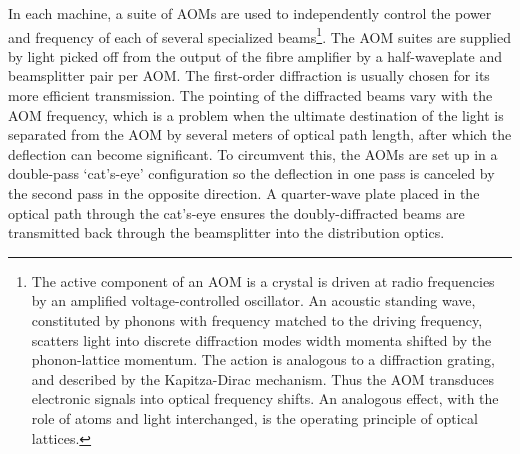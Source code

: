 	



	In each machine, a suite of AOMs are used to independently control the power and frequency of each of several specialized beams\footnote{The active component of an AOM is a crystal is driven at radio frequencies by an amplified voltage-controlled oscillator.	An acoustic standing wave, constituted by phonons with frequency matched to the driving frequency, scatters light into discrete diffraction modes width momenta shifted by the phonon-lattice momentum.	The action is analogous to a diffraction grating, and described by the Kapitza-Dirac mechanism.	Thus the AOM transduces electronic signals into optical frequency shifts.	An analogous effect, with the role of atoms and light interchanged, is the operating principle of optical lattices.}.
	The AOM suites are supplied by light picked off from the output of the fibre amplifier by a half-waveplate and beamsplitter pair per AOM.
	The first-order diffraction is usually chosen for its more efficient transmission.
	The pointing of the diffracted beams vary with the AOM frequency, which is a problem when the ultimate destination of the light is separated from the AOM by several meters of optical path length, after which the deflection can become significant.
	To circumvent this, the AOMs are set up in a double-pass `cat's-eye' configuration so the deflection in one pass is canceled by the second pass in the opposite direction.
	A quarter-wave plate placed in the optical path through the cat's-eye ensures the doubly-diffracted beams are transmitted back through the beamsplitter into the distribution optics.
	
